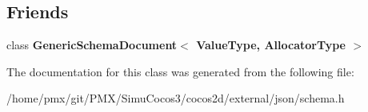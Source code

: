 \subsection*{Friends}
\begin{DoxyCompactItemize}
\item 
\mbox{\label{classinternal_1_1Schema_a04f1d1acd0a5a7fda069c115970d52b3}} 
class {\bfseries Generic\+Schema\+Document$<$ Value\+Type, Allocator\+Type $>$}
\end{DoxyCompactItemize}


The documentation for this class was generated from the following file\+:\begin{DoxyCompactItemize}
\item 
/home/pmx/git/\+P\+M\+X/\+Simu\+Cocos3/cocos2d/external/json/schema.\+h\end{DoxyCompactItemize}
